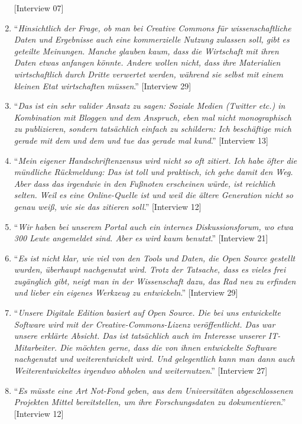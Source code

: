 \documentclass[a4paper,
fontsize=11pt,
oneside,
numbers=noperiodatend,
parskip=half-,
bibliography=totoc,
final
]{scrartcl}
\begin{document}
\begin{enumerate}
  {[}Interview 07{]}
\item
  \enquote{\emph{Hinsichtlich der Frage, ob man bei Creative Commons für
  wissenschaftliche Daten und Ergebnisse auch eine kommerzielle Nutzung
  zulassen soll, gibt es geteilte Meinungen. Manche glauben kaum, dass
  die Wirtschaft mit ihren Daten etwas anfangen könnte. Andere wollen
  nicht, dass ihre Materialien wirtschaftlich durch Dritte verwertet
  werden, während sie selbst mit einem kleinen Etat wirtschaften
  müssen}.} {[}Interview 29{]}
\item
  \enquote{\emph{Das ist ein sehr valider Ansatz zu sagen: Soziale
  Medien (Twitter etc.) in Kombination mit Bloggen und dem Anspruch,
  eben mal nicht monographisch zu publizieren, sondern tatsächlich
  einfach zu schildern: Ich beschäftige mich gerade mit dem und dem und
  tue das gerade mal kund}.} {[}Interview 13{]}
\item
  \enquote{\emph{Mein eigener Handschriftenzensus wird nicht so oft
  zitiert. Ich habe öfter die mündliche Rückmeldung: Das ist toll und
  praktisch, ich gehe damit den Weg. Aber dass das irgendwie in den
  Fußnoten erscheinen würde, ist reichlich selten. Weil es eine
  Online-Quelle ist und weil die ältere Generation nicht so genau weiß,
  wie sie das zitieren soll}.} {[}Interview 12{]}
\item
  \enquote{\emph{Wir haben bei unserem Portal auch ein internes
  Diskussionsforum, wo etwa 300 Leute angemeldet sind. Aber es wird kaum
  benutzt}.} {[}Interview 21{]}
\item
  \enquote{\emph{Es ist nicht klar, wie viel von den Tools und Daten,
  die Open Source gestellt wurden, überhaupt nachgenutzt wird. Trotz der
  Tatsache, dass es vieles frei zugänglich gibt, neigt man in der
  Wissenschaft dazu, das Rad neu zu erfinden und lieber ein eigenes
  Werkzeug zu entwickeln}.} {[}Interview 29{]}
\item
  \enquote{\emph{Unsere Digitale Edition basiert auf Open Source. Die
  bei uns entwickelte Software wird mit der Creative-Commons-Lizenz
  veröffentlicht. Das war unsere erklärte Absicht. Das ist tatsächlich
  auch im Interesse unserer IT-Mitarbeiter. Die möchten gerne, dass die
  von ihnen entwickelte Software nachgenutzt und weiterentwickelt wird.
  Und gelegentlich kann man dann auch Weiterentwickeltes irgendwo
  abholen und weiternutzen}.} {[}Interview 27{]}
\item
  \enquote{\emph{Es müsste eine Art Not-Fond geben, aus dem
  Universitäten abgeschlossenen Projekten Mittel bereitstellen, um ihre
  Forschungsdaten zu dokumentieren}.} {[}Interview 12{]}
\end{enumerate}
\end{document}
